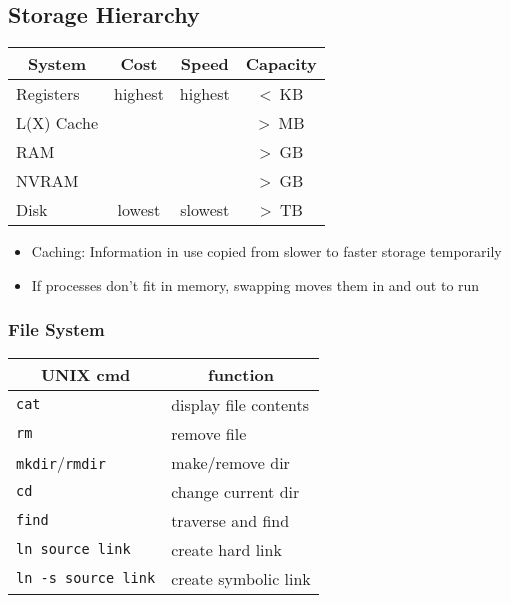 \documentclass[a4paper]{article}
\begin{document}
\subsection{Storage Hierarchy}
\begin{table}[H]
	\centering
	\begin{tabular}{|l|c|c|c|}
		\hline
		\multicolumn{1}{|c|}{\textbf{System}} & \textbf{Cost} & \textbf{Speed} & \textbf{Capacity} \\ \hline
		Registers                             & highest       & highest        & \textless  \ KB      \\ \hline
		L(X) Cache                            &               &                & \textgreater \ MB   \\ \hline
		RAM                                   &               &                & \textgreater \ GB   \\ \hline
		NVRAM                                 &               &                & \textgreater \ GB   \\ \hline
		Disk                                  & lowest        & slowest        & \textgreater \ TB   \\ \hline
	\end{tabular}
\end{table}
\begin{itemize}
	\item Caching: Information in use copied from slower to faster storage temporarily
	\item If processes don’t fit in memory, swapping moves them in and out to run
\end{itemize}
\subsubsection{File System}
\begin{table}[H]
	\centering
	\begin{tabular}{|l|l|}
		\hline
		\multicolumn{1}{|c|}{\textbf{UNIX cmd}} & \multicolumn{1}{c|}{\textbf{function}} \\ \hline
		\texttt{cat}                                     & display file contents                  \\ \hline
		\texttt{rm}                                      & remove file                            \\ \hline
		\texttt{mkdir}/\texttt{rmdir}                             & make/remove dir                        \\ \hline
		\texttt{cd}                                      & change current dir                     \\ \hline
		\texttt{find }                                   & traverse and find                      \\ \hline
		\texttt{ln source link  }                        & create hard link                       \\ \hline
		\texttt{ln -s source link}                       & create symbolic link                   \\ \hline
	\end{tabular}
\end{table}
\end{document}
